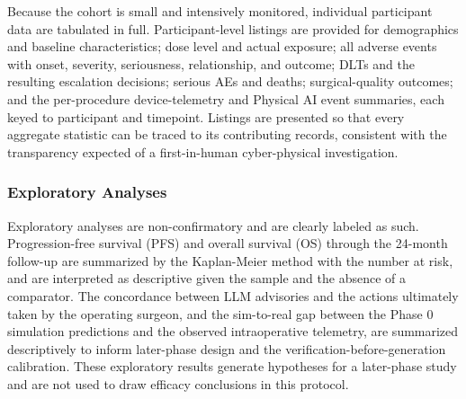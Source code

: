 Because the cohort is small and intensively monitored, individual participant data
are tabulated in full. Participant-level listings are provided for demographics
and baseline characteristics; dose level and actual exposure; all adverse events
with onset, severity, seriousness, relationship, and outcome; DLTs and the
resulting escalation decisions; serious AEs and deaths; surgical-quality outcomes;
and the per-procedure device-telemetry and Physical AI event summaries, each keyed
to participant and timepoint. Listings are presented so that every aggregate
statistic can be traced to its contributing records, consistent with the
transparency expected of a first-in-human cyber-physical investigation.

\subsubsection{Exploratory Analyses}

Exploratory analyses are non-confirmatory and are clearly labeled as such.
Progression-free survival (PFS) and overall survival (OS) through the 24-month
follow-up are summarized by the Kaplan-Meier method with the number at risk, and
are interpreted as descriptive given the sample and the absence of a comparator.
The concordance between LLM advisories and the actions ultimately taken by the
operating surgeon, and the sim-to-real gap between the Phase 0 simulation
predictions and the observed intraoperative telemetry, are summarized descriptively
to inform later-phase design and the verification-before-generation calibration.
These exploratory results generate hypotheses for a later-phase study and are not
used to draw efficacy conclusions in this protocol.
